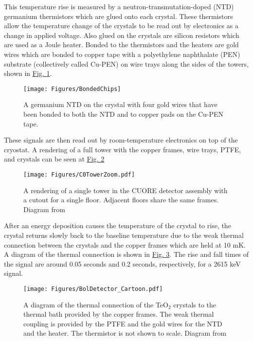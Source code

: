 \documentclass[12pt,a4paper]{article}
\begin{document}
This temperature rise is measured by a neutron-transmutation-doped (NTD) germanium thermistors which are glued onto each crystal. These thermistors allow the temperature change of the crystals to be read out by electronics as a change in applied voltage. Also glued on the crystals are silicon resistors which are used as a Joule heater. Bonded to the thermistors and the heaters are gold wires which are bonded to copper tape with a polyethylene naphthalate (PEN) substrate (collectively called Cu-PEN) on wire trays along the sides of the towers, shown in \hyperref[fig:bondedchips]{Fig. \ref*{fig:bondedchips}}.
\begin{figure}[htbp]
\centering
\texttt{[image: Figures/BondedChips]}
\caption{A germanium NTD on the crystal with four gold wires that have been bonded to both the NTD and to copper pads on the Cu-PEN tape.}
\label{fig:bondedchips}
\end{figure}
These signals are then read out by room-temperature electronics on top of the cryostat. A rendering of a full tower with the copper frames, wire trays, PTFE, and crystals can be seen at \hyperref[fig:SingleTowerWithZoom]{Fig. \ref*{fig:SingleTowerWithZoom}}

\begin{figure}[htbp]
\centering
\texttt{[image: Figures/C0TowerZoom.pdf]}
\caption[A rendering of a single tower in the CUORE detector assembly with a cutout for a single floor. Adjacent floors share the same frames.]{A rendering of a single tower in the CUORE detector assembly with a cutout for a single floor. Adjacent floors share the same frames. Diagram from \cite{Alduino:2016vjd}}
\label{fig:SingleTowerWithZoom}
\end{figure}

After an energy deposition causes the temperature of the crystal to rise, the crystal returns slowly back to the baseline temperature due to the weak thermal connection between the crystals and the copper frames which are held at 10 mK. A diagram of the thermal connection is shown in \hyperref[fig:thermal_crystal_cartoon]{Fig. \ref*{fig:thermal_crystal_cartoon}}. The rise and fall times of the signal are around 0.05 seconds and 0.2 seconds, respectively, for a 2615 keV signal.

\begin{figure}[htbp]
\centering
\texttt{[image: Figures/BolDetector\_Cartoon.pdf]}
\caption[A diagram of the thermal connection of the TeO$_2$ crystals to the thermal bath provided by the copper frames. The weak thermal coupling is provided by the PTFE and the gold wires for the NTD and the heater. The thermistor is not shown to scale.]{A diagram of the thermal connection of the TeO$_2$ crystals to the thermal bath provided by the copper frames. The weak thermal coupling is provided by the PTFE and the gold wires for the NTD and the heater. The thermistor is not shown to scale. Diagram from \cite{Alduino:2016vjd}}
\label{fig:thermal_crystal_cartoon}
\end{figure}
\end{document}
